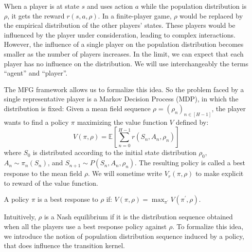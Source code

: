 \documentclass{article}
\begin{document}
When a player is at state $s$ and uses action $a$ while the population distribution is $\rho$, it gets the reward $r(s,a,\rho)$. In a finite-player game, $\rho$ would be replaced by the empirical distribution of the other players' states. These players would be influenced by the player under consideration, leading to complex interactions. However, the influence of a single player on the population distribution becomes smaller as the number of players increases. In the limit, we can expect that each player has no influence on the distribution. We will use interchangeably the terms ``agent'' and ``player''.

The MFG framework allows us to formalize this idea.
So the problem faced by a single representative player is a Markov Decision Process (MDP), in which the distribution is fixed: Given a mean field sequence $\rho = (\rho_n)_{n \in [H-1]}$, the player wants to find a policy $\pi$ maximizing the value function $V$ defined by:
\begin{equation*}
    V(\pi, \rho) = \mathbb{E}\left[ \sum_{n=0}^{H-1} r(S_n, A_n, \rho_n)\right]
\end{equation*}
where $S_0$ is distributed according to the initial state distribution $\rho_0$, $A_n \sim \pi_n(S_n)$, and $S_{n+1} \sim P(S_n, A_n, \rho_n)$. 
The resulting policy is called a best response to the mean field $\rho$. We will sometime write $V_r(\pi,\rho)$ to make explicit to reward of the value function.

\begin{definition}
A policy $\pi$ is a best response to $\rho$ if:  $V(\pi,\rho)=\max_{\pi^{\prime}}V(\pi^{\prime},\rho)$.
\end{definition}
Intuitively, $\rho$ is a Nash equilibrium if it is the distribution sequence obtained when all the players use a best response policy against $\rho$. 
To formalize this idea, we introduce the notion of population distribution sequence induced by a policy, that does influence the transition kernel.
\end{document}
